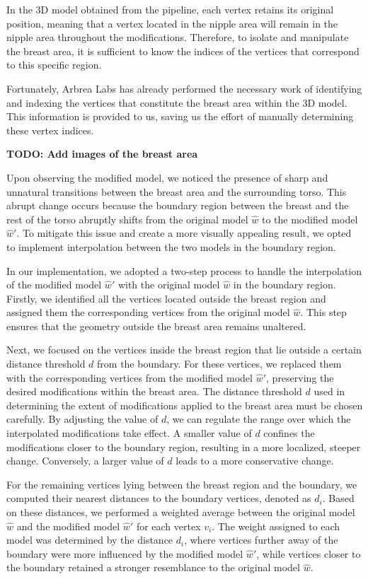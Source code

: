 In the 3D model obtained from the pipeline, each vertex retains its original position, meaning that a vertex located in the nipple area will remain in the nipple area throughout the modifications. 
Therefore, to isolate and manipulate the breast area, it is sufficient to know the indices of the vertices that correspond to this specific region.

Fortunately, Arbrea Labs has already performed the necessary work of identifying and indexing the vertices that constitute the breast area within the 3D model. This information is provided to us, 
saving us the effort of manually determining these vertex indices.

\textbf{TODO: Add images of the breast area}

Upon observing the modified model, we noticed the presence of sharp and unnatural transitions between the breast area and the surrounding torso. This abrupt change occurs because the boundary 
region between the breast and the rest of the torso abruptly shifts from the original model $\hat{w}$ to the modified model $\hat{w}'$. To mitigate this issue and create a more visually 
appealing result, we opted to implement interpolation between the two models in the boundary region.

In our implementation, we adopted a two-step process to handle the interpolation of the modified model $\hat{w}'$ with the original model $\hat{w}$ in the boundary region. Firstly, 
we identified all the vertices located outside the breast region and assigned them the corresponding vertices from the original model $\hat{w}$. This step ensures that the geometry 
outside the breast area remains unaltered.

Next, we focused on the vertices inside the breast region that lie outside a certain distance threshold $d$ from the boundary. For these vertices, we replaced them with the corresponding 
vertices from the modified model $\hat{w}'$, preserving the desired modifications within the breast area. The distance threshold $d$ used in determining the extent of 
modifications applied to the breast area must be chosen carefully. By adjusting the value of $d$, we can regulate the range over which the interpolated modifications take effect. 
A smaller value of $d$ confines the modifications closer to the boundary region, resulting in a more localized, steeper change. Conversely, a larger value of $d$ leads to a more conservative
change.

For the remaining vertices lying between the breast region and the boundary, we computed their nearest distances to the boundary vertices, denoted as $d_i$. Based on these distances, 
we performed a weighted average between the original model $\hat{w}$ and the modified model $\hat{w}'$ for each vertex $v_i$. The weight assigned to each model was determined by the 
distance $d_i$, where vertices further away of the boundary were more influenced by the modified model $\hat{w}'$, while vertices closer to the boundary retained a stronger resemblance to the 
original model $\hat{w}$.

